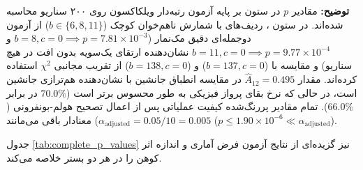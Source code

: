 \documentclass[oneside,openany,phd]{TMU-Thesis}
\begin{document}
\begin{table}[htbp]
{\begin{tabular}{|l|c|c|c|c|}
\end{tabular}%
}
\smallskip
\parbox{\textwidth}{\scriptsize \textbf{توضیح:} مقادیر $p$ در ستون  بر پایه آزمون رتبه‌دار ویلکاکسون روی ۲۰۰ سناریو محاسبه شده‌اند. در ستون ، ردیف‌های با شمارش ناهم‌خوان کوچک ($b \in \{6, 8, 11\}$) از آزمون دوجمله‌ای دقیق مک‌نمار ($b=8, c=0 \implies p = 7.81 \times 10^{-3}$ و $b=11, c=0 \implies p = 9.77 \times 10^{-4}$ نشان‌دهنده ارتقای یک‌سویه بدون افت در هیچ سناریو) و مقایسه با  ($b=137, c=0$) و  ($b=138, c=0$) از تقریب مجانبی $\chi^2$ استفاده کرده‌اند. مقدار $\hat{A}_{12} = 0.495$ در مقایسه انطباق جانشین \mursdrl با  نشان‌دهنده هم‌ترازی جانشین است، در حالی که نرخ بقای پرواز فیزیکی \mursdrl به طور محسوس برتر است ($70.0\%$ در برابر $66.0\%$). تمام مقادیر پررنگ‌شده کیفیت عملیاتی پس از اعمال تصحیح هولم-بونفرونی ($\alpha_{\text{adjusted}} = 0.05 / 10 = 0.005$) معنادار باقی می‌مانند ($p \le 1.90 \times 10^{-6} \ll \alpha_{\text{adjusted}}$).}
\end{table}

جدول \ref{tab:complete_p_values} نیز گزیده‌ای از نتایج آزمون فرض آماری و اندازه اثر کوهن را در هر دو بستر خلاصه می‌کند.

\begin{table}[htbp]
\centering
\caption{نتایج آزمون‌های فرض آماری، مقادیر $p$ و اندازه‌های اثر کوهن در هر دو بستر ارزیابی}
\label{tab:complete_p_values}
\end{table}
\end{document}
